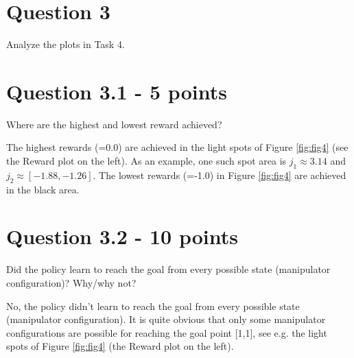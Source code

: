 \documentclass[12pt]{article}
\begin{document}
\section*{Question 3}

Analyze the plots in Task 4.

\section*{Question 3.1 - 5 points}

Where are the highest and lowest reward achieved?
\newline

\noindent
The highest rewards (=0.0) are achieved in the light spots of Figure \ref*{fig:fig4} (see the Reward plot on the left). As an example, one such spot area is $j_1 \approx 3.14$ and $j_2 \approx [-1.88,-1.26]$. The lowest rewards (=-1.0) in Figure \ref*{fig:fig4} are achieved in the black area.



\section*{Question 3.2 - 10 points}

Did the policy learn to reach the goal from every possible state (manipulator
configuration)? Why/why not?
\newline

\noindent
No, the policy didn't learn to reach the goal from every possible state (manipulator configuration). It is quite obvious that only some manipulator configurations are possible for reaching the goal point [1,1], see e.g. the light spots of Figure \ref*{fig:fig4} (the Reward plot on the left).
\end{document}

